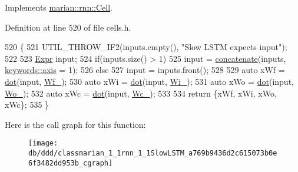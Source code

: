 Implements \hyperlink{classmarian_1_1rnn_1_1Cell_a8e02cc3d239bc9947cd3200ff2995a01}{marian\+::rnn\+::\+Cell}.



Definition at line 520 of file cells.\+h.


\begin{DoxyCode}
520                                                      \{
521     UTIL\_THROW\_IF2(inputs.empty(), \textcolor{stringliteral}{"Slow LSTM expects input"});
522 
523     \hyperlink{namespacemarian_a498d8baf75b754011078b890b39c8e12}{Expr} input;
524     \textcolor{keywordflow}{if}(inputs.size() > 1)
525       input = \hyperlink{namespacemarian_a2791a2c8f79a938f5cb22ae613680675}{concatenate}(inputs, \hyperlink{namespacemarian_1_1keywords_ace9158eabbddaca833133f12da98b9d6}{keywords::axis} = 1);
526     \textcolor{keywordflow}{else}
527       input = inputs.front();
528 
529     \textcolor{keyword}{auto} xWf = \hyperlink{namespacemarian_ad7fbf1ba8e2e04ffdc7d5e4841b5e691}{dot}(input, \hyperlink{classmarian_1_1rnn_1_1SlowLSTM_ab8dd236b36be5cdd108e75b9116da34e}{Wf\_});
530     \textcolor{keyword}{auto} xWi = \hyperlink{namespacemarian_ad7fbf1ba8e2e04ffdc7d5e4841b5e691}{dot}(input, \hyperlink{classmarian_1_1rnn_1_1SlowLSTM_a9cd05b7615b49553add0e718d3d05e8f}{Wi\_});
531     \textcolor{keyword}{auto} xWo = \hyperlink{namespacemarian_ad7fbf1ba8e2e04ffdc7d5e4841b5e691}{dot}(input, \hyperlink{classmarian_1_1rnn_1_1SlowLSTM_ac6a0bf627927c7fb78f5042b312b573e}{Wo\_});
532     \textcolor{keyword}{auto} xWc = \hyperlink{namespacemarian_ad7fbf1ba8e2e04ffdc7d5e4841b5e691}{dot}(input, \hyperlink{classmarian_1_1rnn_1_1SlowLSTM_a9981cd88285835c0ce91ee69441467fb}{Wc\_});
533 
534     \textcolor{keywordflow}{return} \{xWf, xWi, xWo, xWc\};
535   \}
\end{DoxyCode}


Here is the call graph for this function\+:
\nopagebreak
\begin{figure}[H]
\begin{center}
\leavevmode
\texttt{[image: db/ddd/classmarian\_1\_1rnn\_1\_1SlowLSTM\_a769b9436d2c615073b0e6f3482dd953b\_cgraph]}
\end{center}
\end{figure}


